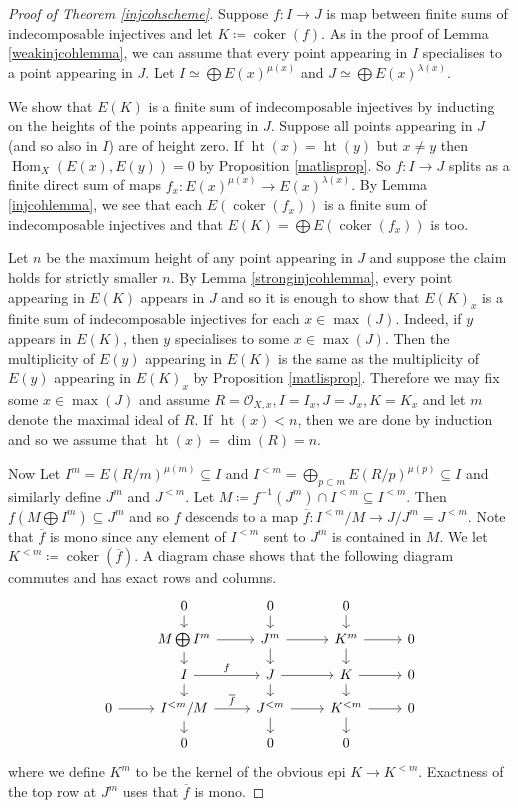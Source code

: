 \documentclass[12pt,oneside]{amsart}
\DeclareMathOperator*{\coker}{coker}
\DeclareMathOperator{\Hom}{Hom}
\DeclareMathOperator{\hgt}{ht}
\begin{document}
\begin{proof}[Proof of Theorem \ref{injcohscheme}]
Suppose $f: I \to J$ is map between finite sums of indecomposable injectives and let $K \coloneq \coker(f)$. As in the proof of Lemma \ref{weakinjcohlemma}, we can assume that every point appearing in $I$ specialises to a point appearing in $J$. Let $I \simeq \bigoplus E(x)^{\mu(x)}$ and  $J \simeq \bigoplus E(x)^{\lambda(x)}$. 

We show that $E(K)$ is a finite sum of indecomposable injectives by inducting on the heights of the points appearing in $J$. Suppose all points appearing in $J$ (and so also in $I$) are of height zero. If $\hgt(x) = \hgt(y)$ but $x \neq y$ then $\Hom_X(E(x),E(y)) = 0$ by Proposition \ref{matlisprop}. So $f: I \to J$ splits as a finite direct sum of maps $f_x : E(x)^{\mu(x)} \to E(x)^{\lambda(x)}$. By Lemma \ref{injcohlemma}, we see that each $E(\coker(f_x))$ is a finite sum of indecomposable injectives and that $E(K) = \bigoplus E(\coker(f_x))$ is too.

Let $n$ be the maximum height of any point appearing in $J$ and suppose the claim holds for strictly smaller $n$. By Lemma \ref{stronginjcohlemma}, every point appearing in $E(K)$ appears in $J$ and so it is enough to show that $E(K)_x$ is a finite sum of indecomposable injectives for each $x \in \max(J)$. Indeed, if $y$ appears in $E(K)$, then $y$ specialises to some $x \in \max(J)$. Then the multiplicity of $E(y)$ appearing in $E(K)$ is the same as the multiplicity of $E(y)$ appearing in $E(K)_x$ by Proposition \ref{matlisprop}. Therefore we may fix some $x \in \max(J)$ and assume $R = \mathcal{O}_{X,x}, I = I_x, J = J_x, K = K_x$ and let $m$ denote the maximal ideal of $R$. If $\hgt(x) < n$, then we are done by induction and so we assume that $\hgt(x) = \dim(R) = n$. 

Now Let $I^m = E(R/m)^{\mu(m)} \subseteq I$ and $I^{<m} = \bigoplus_{p \subset m} E(R/p)^{\mu(p)} \subseteq I$ and similarly define $J^m$ and $J^{<m}$. Let $
M \coloneq f^{-1}(J^m) \cap I^{< m} \subseteq I^{<m}$. Then $f(M \bigoplus I^m) \subseteq J^m$ and so $f$ descends to a map $\overline{f}: I^{<m}/M \to J/J^m = J^{<m}$. Note that $\overline{f}$ is mono since any element of $I^{<m}$ sent to $J^m$ is contained in $M$. We let  $K^{<m} \coloneq \coker(\overline{f})$. A diagram chase shows that the following diagram commutes and has exact rows and columns. 
\[
\begin{tikzcd}[row sep = small]
  & 0 \arrow[d] & 0 \arrow[d] & 0 \arrow[d] & \\
& M \bigoplus I^m \arrow[d]
\arrow[r] & J^{m} \arrow[d] \arrow[r] & K^m \arrow[r]  \arrow[d] & 0  \\
& I \arrow[d] \arrow[r,"f"]  & J \arrow[r] \arrow[d] & K \arrow[r] \arrow[d] & 0 \\
0 \arrow[r]  & I^{<m}/ M \arrow[r,"\overline{f}"] \arrow[d] & \arrow[d] J^{<m} \arrow[r]& K^{<m} \arrow[r] \arrow[d] & 0 \\
  &  0   & 0   & 0 
\end{tikzcd}
\]
where we define $K^m$ to be the kernel of the obvious epi $K \to K^{<m}$. Exactness of the top row at $J^m$ uses that $\overline{f}$ is mono. 


\end{proof}
\end{document}
